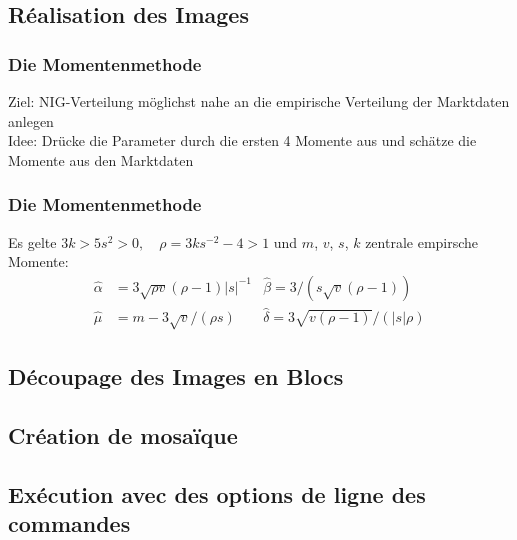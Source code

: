 \documentclass[handout]{beamer}
\newcommand{\tcb}{\color{blue}}
\begin{document}
\subsection{R\'ealisation des Images}
\begin{frame}

\frametitle{\bf Die Momentenmethode}
{\tcb Ziel:} NIG-Verteilung m\"oglichst nahe an die empirische Verteilung der Marktdaten anlegen\\ \pause
{\tcb Idee:} Dr\"ucke die Parameter durch die ersten 4 Momente aus und sch\"atze die Momente aus den Marktdaten

\end{frame}

\begin{frame}
\frametitle{\bf Die Momentenmethode}
Es gelte $3k>5s^2>0, \quad \rho=3ks^{-2}-4>1$ und $m$, $v$, $s$, $k$ zentrale empirsche Momente:
\begin{align*}
\hat{\alpha}&=3\sqrt{\rho v}(\rho-1)|s|^{-1}  &\hat{\beta}=3/(s\sqrt{v}(\rho-1))\quad\\
\hat{\mu}&=m-3\sqrt{v}/(\rho s)  &\hat{\delta}=3\sqrt{v(\rho-1)}/(|s|\rho)
\end{align*}
\end{frame}



\subsection{D\'ecoupage des Images en Blocs}
\subsection{Cr\'eation de mosa\"ique}
\subsection{Ex\'ecution avec des options de ligne des commandes}
\end{document}
